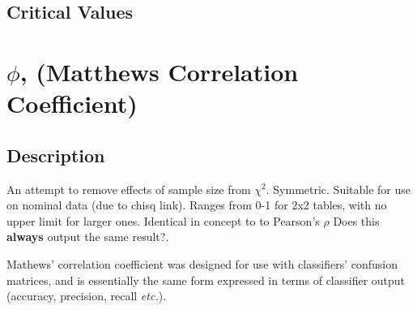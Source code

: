 \documentclass[11pt]{article}
\begin{document}
\subsection{Critical Values}













\section{$\phi$, (Matthews Correlation Coefficient)}
\label{section:phi}
\subsection{Description}
An attempt to remove effects of sample size from $\chi^2$.  
Symmetric. 
Suitable for use on nominal data (due to chisq link). %
Ranges from 0-1 for 2x2 tables, with no upper limit for larger ones.  
Identical in concept to to Pearson's $\rho$ {\color{red} Does this \textbf{always} output the same result?}.

Mathews' correlation coefficient was designed for use with classifiers' confusion matrices, and is essentially the same form expressed in terms of classifier output (accuracy, precision, recall \textsl{etc.}). 
\end{document}
